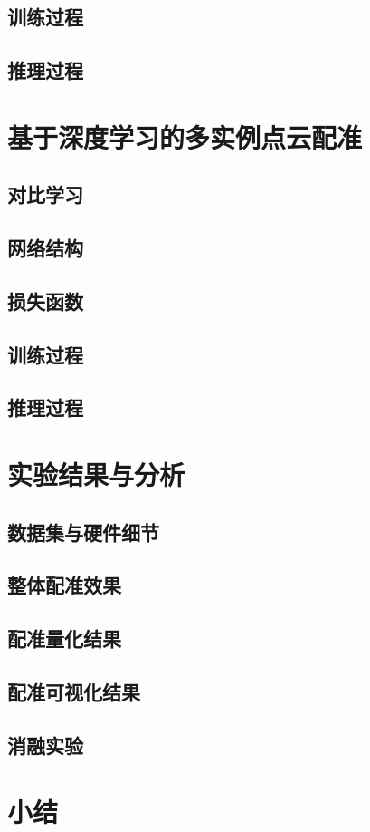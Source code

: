 \subsection{训练过程}

\subsection{推理过程}

\section{基于深度学习的多实例点云配准}
\subsection{对比学习}
\subsection{网络结构}
\subsection{损失函数}
\subsection{训练过程}
\subsection{推理过程}

\section{实验结果与分析}
\subsection{数据集与硬件细节}
\subsection{整体配准效果}
\subsection{配准量化结果}
\subsection{配准可视化结果}
\subsection{消融实验}

\section{小结}